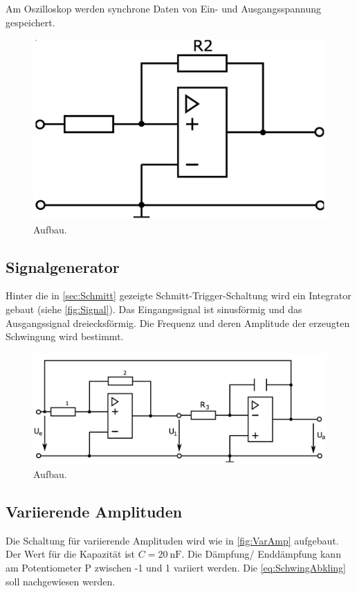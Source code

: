 Am Oszilloskop werden synchrone Daten von Ein- und Ausgangsspannung gespeichert.

\begin{figure}
    \centering
    \includegraphics[width=0.7\linewidth]{./figures/4_Schmitt.png}
    \caption{Aufbau. \cite{Anleitung}}
    \label{fig:Schmitt}
\end{figure}


\subsection{Signalgenerator}
Hinter die in \autoref{sec:Schmitt} gezeigte Schmitt-Trigger-Schaltung wird ein Integrator gebaut (siehe \autoref{fig:Signal}). Das Eingangssignal ist sinusförmig und das Ausgangssignal dreiecksförmig. Die Frequenz und deren Amplitude der erzeugten Schwingung wird bestimmt. 

\begin{figure}
    \centering
    \includegraphics[width=0.7\linewidth]{./figures/5_Signal.png}
    \caption{Aufbau. \cite{Anleitung}}
    \label{fig:Signal}
\end{figure}


\subsection{Variierende Amplituden}
Die Schaltung für variierende Amplituden wird wie in \autoref{fig:VarAmp} aufgebaut. Der Wert für die Kapazität ist $C = \SI{20}{\nano\farad}$. %
Die Dämpfung/ Enddämpfung kann am Potentiometer P zwischen -1 und 1 variiert werden.
Die \autoref{eq:SchwingAbkling} soll nachgewiesen werden.

